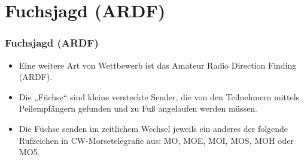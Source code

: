 
\section{Fuchsjagd (ARDF)}
\label{section:ardf}
\begin{frame}%

\frametitle{Fuchsjagd (ARDF)}
\begin{itemize}
  \item Eine weitere Art von Wettbewerb ist das Amateur Radio Direction Finding (ARDF).
  \item Die „Füchse“ sind kleine versteckte Sender, die von den Teilnehmern mittels Peilempfängern gefunden und zu Fuß angelaufen werden müssen.
  \item Die Füchse senden im zeitlichem Wechsel jeweils ein anderes der folgende Rufzeichen in CW-Morsetelegrafie aus: MO, MOE, MOI, MOS, MOH oder MO5.
  \end{itemize}
\end{frame}

